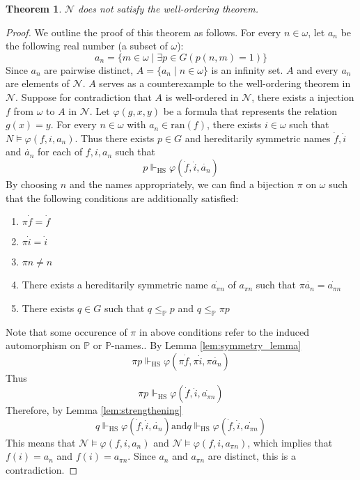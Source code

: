 \documentclass{report}
\newtheorem{thm}{Theorem}[section]
\begin{document}
\begin{thm}
  $\mathcal{N}$ does not satisfy the well-ordering theorem.
\end{thm}

\begin{proof}
We outline the proof of this theorem as follows. 
For every $n \in \omega$, let $a_n$ be the following real number (a subset of $\omega$):
$$a_n = \{ m \in \omega \mid \exists p \in G (p(n, m) = 1) \}$$
Since $a_n$ are pairwise distinct, $A = \{ a_n \mid n \in \omega \}$ is an infinity set.
$A$ and every $a_n$ are elements of $\mathcal{N}$.
$A$ serves as a counterexample to the well-ordering theorem in $\mathcal{N}$.
Suppose for contradiction that $A$ is well-ordered in $\mathcal{N}$, there exists a injection $f$ from $\omega$ to $A$ in $\mathcal{N}$.
Let $\varphi(g,x,y)$ be a formula that represents the relation $g(x) = y$. 
For every $n \in \omega$ with $a_n \in \mathrm{ran}(f)$, there exists $i \in \omega$ such that $N \vDash \varphi(f, i, a_n)$.
Thus there exists $p \in G$ and hereditarily symmetric names $\dot{f}, \dot{i}$ and $\dot{a_n}$ for each of $f, i, a_n$ such that 
$$p \Vdash_{\mathrm{HS}} \varphi(\dot{f}, \dot{i}, \dot{a_n})$$
By choosing $n$ and the names appropriately, we can find a bijection $\pi$ on $\omega$ such that the following conditions are additionally satisfied:
\begin{enumerate}
  \item $\pi \dot{f} = \dot{f}$
  \item $\pi \dot{i} = \dot{i}$
  \item $\pi n \ne n$
  \item There exists a hereditarily symmetric name $\dot{a_{\pi n}}$ of $a_{\pi n}$ such that $\pi \dot{a_n} = \dot{a_{\pi n}}$
  \item There exists $q \in G$ such that $q \leq_{\mathbb{P}} p$ and $q \leq_{\mathbb{P}} \pi p$
\end{enumerate}
Note that some occurence of $\pi$ in above conditions refer to the induced automorphism on $\mathbb{P}$ or $\mathbb{P}$-names..
By Lemma \ref{lem:symmetry_lemma}
$$\pi p \Vdash_{\mathrm{HS}} \varphi(\pi \dot{f}, \pi \dot{i}, \pi \dot{a_n})$$
Thus 
$$\pi p \Vdash_{\mathrm{HS}} \varphi(\dot{f}, \dot{i}, \dot{a_{\pi n}})$$
Therefore, by Lemma \ref{lem:strengthening}
$$q \Vdash_{\mathrm{HS}} \varphi(\dot{f}, \dot{i}, \dot{a_n}) \mathrm{ and } q \Vdash_{\mathrm{HS}} \varphi(\dot{f}, \dot{i}, \dot{a_{\pi n}})$$
This means that $\mathcal{N} \vDash \varphi(f, i, a_n)$ and $\mathcal{N} \vDash \varphi(f, i, a_{\pi n})$, which implies that $f(i) = a_n$ and $f(i) = a_{\pi n}$.
Since $a_n$ and $a_{\pi n}$ are distinct, this is a contradiction. 
\end{proof}
 
\end{document}

